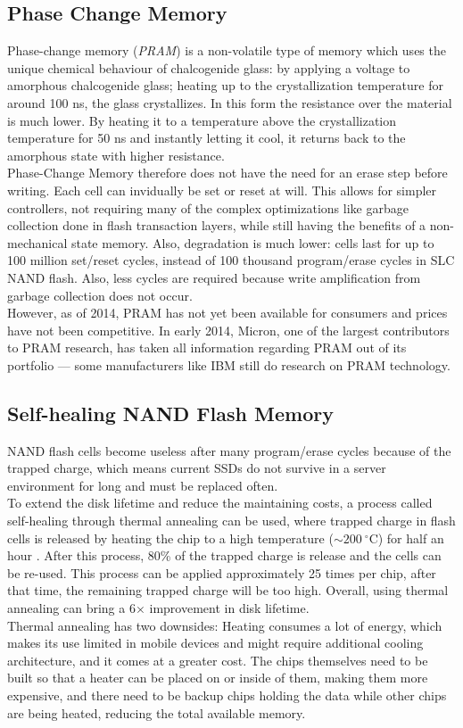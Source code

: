 \documentclass{acm_proc_article-sp}
\begin{document}
\subsection{Phase Change Memory}
Phase-change memory (\emph{PRAM}) is a non-volatile type of memory which uses the unique chemical behaviour of chalcogenide glass: by applying a voltage to amorphous chalcogenide glass; heating up to the crystallization temperature for around 100 ns, the glass crystallizes. In this form the resistance over the material is much lower. By heating it to a temperature above the crystallization temperature for 50 ns and instantly letting it cool, it returns back to the amorphous state with higher resistance.
\\
Phase-Change Memory therefore does not have the need for an erase step before writing. Each cell can invidually be set or reset at will. This allows for simpler controllers, not requiring many of the complex optimizations like garbage collection done in flash transaction layers, while still having the benefits of a non-mechanical state memory. Also, degradation is much lower: cells last for up to 100 million set/reset cycles, instead of 100 thousand program/erase cycles in SLC NAND flash. Also, less cycles are required because write amplification from garbage collection does not occur.
\\
However, as of 2014, PRAM has not yet been available for consumers and prices have not been competitive. In early 2014, Micron, one of the largest contributors to PRAM research, has taken all information regarding PRAM out of its portfolio --- some manufacturers like IBM still do research on PRAM technology.

\subsection{Self-healing NAND Flash Memory}
NAND flash cells become useless after many program/erase cycles because of the trapped charge, which means current SSDs do not survive in a server environment for long and must be replaced often.
\\
To extend the disk lifetime and reduce the maintaining costs, a process called self-healing through thermal annealing can be used, where trapped charge in flash cells is released by heating the chip to a high temperature ($\sim 200~^{\circ}$C) for half an hour \cite{wu2011exploiting}. After this process, 80\% of the trapped charge is release and the cells can be re-used. This process can be applied approximately 25 times per chip, after that time, the remaining trapped charge will be too high. Overall, using thermal annealing can bring a 6$\times$ improvement in disk lifetime.
\\
Thermal annealing has two downsides: Heating consumes a lot of energy, which makes its use limited in mobile devices and might require additional cooling architecture, and it comes at a greater cost. The chips themselves need to be built so that a heater can be placed on or inside of them, making them more expensive, and there need to be backup chips holding the data while other chips are being heated, reducing the total available memory.
\end{document}
